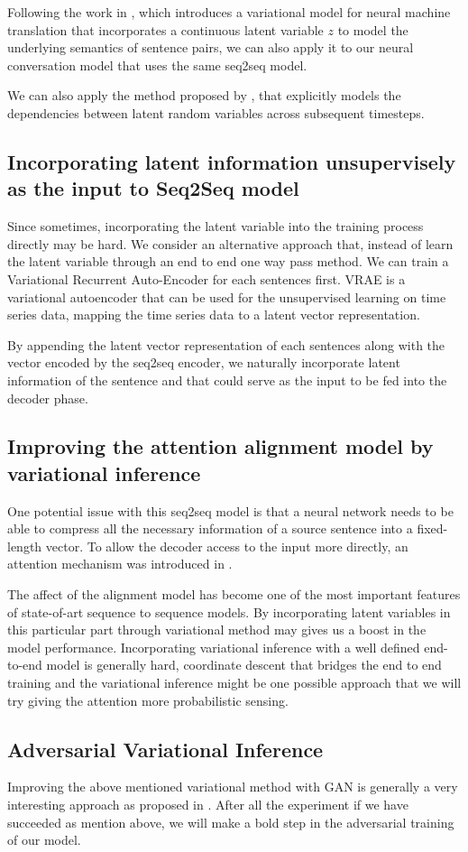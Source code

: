 \documentclass{article}
\begin{document}
Following the work in \cite{vnmt}, which introduces a variational model for neural machine translation that incorporates a continuous latent variable $z$ to model the underlying semantics of sentence pairs, we can also apply it to our neural conversation model that uses the same seq2seq model. 

We can also apply the method proposed by \cite{vrnn}, that explicitly models the dependencies between latent random variables across subsequent timesteps.

\subsection{Incorporating latent information unsupervisely as the input to Seq2Seq model}
Since sometimes, incorporating the latent variable into the training process directly may be hard. We consider an alternative approach that, instead of learn the latent variable through an end to end one way pass method. We can train a Variational Recurrent Auto-Encoder \cite{vrae} for each sentences first. VRAE is a variational autoencoder that can be used for the unsupervised learning on time series data, mapping the time series data to a latent vector representation. 

By appending the latent vector representation of each sentences along with the vector encoded by the seq2seq encoder, we naturally incorporate latent information of the sentence and that could serve as the input to be fed into the decoder phase.

\subsection{Improving the attention alignment model by variational inference }

One potential issue with this seq2seq model is that a neural network needs to be able to compress all the necessary information of a source sentence into a fixed-length vector. To allow the decoder access to the input more directly, an attention mechanism was introduced in \cite{attention}.

The affect of the alignment model has become one of the most important features of state-of-art sequence to sequence models. By incorporating latent variables in this particular part through variational method may gives us a boost in the model performance. Incorporating variational inference with a well defined end-to-end model is generally hard, coordinate descent that bridges the end to end training and the variational inference might be one possible approach that we will try giving the attention more probabilistic sensing.

\subsection{Adversarial Variational Inference}
Improving the above mentioned variational method with GAN is generally a very interesting approach as proposed in \cite{aae}. After all the experiment if we have succeeded as mention above, we will make a bold step in the adversarial training of our model.



\end{document}
